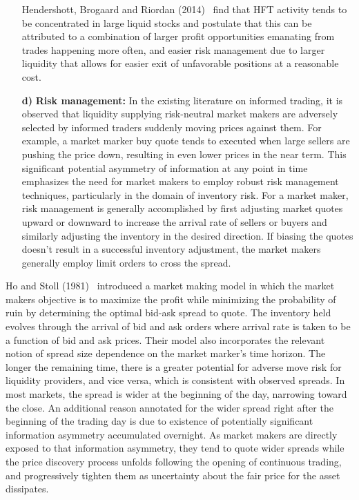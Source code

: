\begin{enumerate}
Hendershott, Brogaard and Riordan (2014)~\cite{hendershott2014} find that HFT activity tends to be concentrated in large liquid stocks and postulate that this can be attributed to a combination of larger profit opportunities emanating from trades happening more often, and easier risk management due to larger liquidity that allows for easier exit of unfavorable positions at a reasonable cost. \twomedskip


\item[\textbf{d)}] \textbf{Risk management:} In the existing literature on informed trading, it is observed that liquidity supplying risk-neutral market makers are adversely selected by informed traders suddenly moving prices against them. For example, a market marker buy quote tends to executed when large sellers are pushing the price down, resulting in even lower prices in the near term. This significant potential asymmetry of information at any point in time emphasizes the need for market makers to employ robust risk management techniques, particularly in the domain of inventory risk. For a market maker, risk management is generally accomplished by first adjusting market quotes upward or downward to increase the arrival rate of sellers or buyers and similarly adjusting the inventory in the desired direction. If biasing the quotes doesn't result in a successful inventory adjustment, the market makers generally employ limit orders to cross the spread.
\end{enumerate}


Ho and Stoll (1981)~\cite{ho1981} introduced a market making model in which the market makers objective is to maximize the profit while minimizing the probability of ruin by determining the optimal bid-ask spread to quote. The inventory held evolves through the arrival of bid and ask orders where arrival rate is taken to be a function of bid and ask prices. Their model also incorporates the relevant notion of spread size dependence on the market marker's time horizon. The longer the remaining time, there is a greater potential for adverse move risk for liquidity providers, and vice versa, which is consistent with observed spreads. In most markets, the spread is wider at the beginning of the day, narrowing toward the close. An additional reason annotated for the wider spread right after the beginning of the trading day is due to existence of potentially significant information asymmetry accumulated overnight. As market makers are directly exposed to that information asymmetry, they tend to quote wider spreads while the price discovery process unfolds following the opening of continuous trading, and progressively tighten them as uncertainty about the fair price for the asset dissipates.


